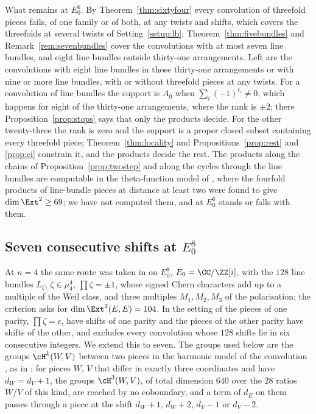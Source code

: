 What remains at $E_{0}^{6}$. By Theorem~\ref{thm:sixtyfour} every convolution of threefold pieces fails, of one family or of both, at any twists and shifts, which covers the threefolds at several twists of Setting~\ref{setup:lb}; Theorem~\ref{thm:fivebundles} and Remark~\ref{rem:sevenbundles} cover the convolutions with at most seven line bundles, and eight line bundles outside thirty-one arrangements. Left are the convolutions with eight line bundles in those thirty-one arrangements or with nine or more line bundles, with or without threefold pieces at any twists. For a convolution of line bundles the support is $A_{0}$ when $\sum_{i}(-1)^{t_{i}}\ne0$, which happens for eight of the thirty-one arrangements, where the rank is $\pm2$; there Proposition~\ref{prop:stops} says that only the products decide. For the other twenty-three the rank is zero and the support is a proper closed subset containing every threefold piece; Theorem~\ref{thm:locality} and Propositions~\ref{prop:rest} and \ref{prop:ci} constrain it, and the products decide the rest. The products along the chains of Proposition~\ref{prop:twostep} and along the cycles through the line bundles are computable in the theta-function model of \cite[\S18]{BMB26}, where the fourfold products of line-bundle pieces at distance at least two were found to give $\dim\Ext^{2}\ge69$; we have not computed them, and \Fii{} at $E_{0}^{6}$ stands or falls with them.

\subsection{\texorpdfstring{Seven consecutive shifts at $E_{0}^{8}$}{Seven consecutive shifts at E0 to the 8}}\label{ssec:efourseven}

At $n=4$ the same route was taken in \cite[\S18]{BMB26} on $E_{0}^{8}$, $E_{0}=\CC/\ZZ[i]$, with the $128$ line bundles $L_{\zeta}$, $\zeta\in\mu_{4}^{4}$, $\prod\zeta=\pm1$, whose signed Chern characters add up to a multiple of the Weil class, and three multiples $M_{1},M_{2},M_{3}$ of the polarisation; the criterion asks for $\dim\Ext^{2}(E,E)=104$. In the setting of \cite[Lemma~18.36]{BMB26} the pieces of one parity, $\prod\zeta=\epsilon$, have shifts of one parity and the pieces of the other parity have shifts of the other, and \cite[Cor.~18.48]{BMB26} excludes every convolution whose $128$ shifts lie in six consecutive integers. We extend this to seven. The groups used below are the groups $\cH^{k}(W,V)$ between two pieces in the harmonic model of the convolution \cite[Lemma~18.24]{BMB26}, as in \cite[Thm.~18.37 and Lemma~18.39]{BMB26}: for pieces $W$, $V$ that differ in exactly three coordinates and have $d_{W}=d_{V}+1$, the groups $\cH^{3}(W,V)$, of total dimension $640$ over the $28$ ratios $W/V$ of this kind, are reached by no coboundary, and a term of $d_{E}$ on them passes through a piece at the shift $d_{W}+1$, $d_{W}+2$, $d_{V}-1$ or $d_{V}-2$.

